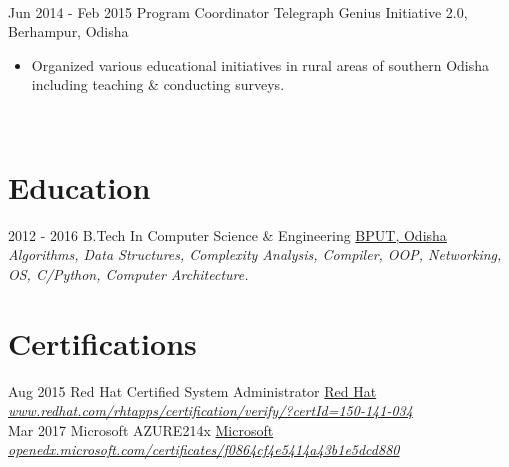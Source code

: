 \documentclass[a4paper]{twentysecondcv} %
\begin{document}
\begin{twenty}
{\begin{itemize}
    \end{itemize}
    	}
        \\
     \twentyitem
   		{Jun 2014 -}
		{Feb 2015}
        {Program Coordinator}
        {Telegraph Genius Initiative 2.0, Berhampur, Odisha}
        {}
        {
        \begin{itemize}
        \item Organized various educational initiatives in rural areas of southern Odisha including teaching \& conducting surveys.
    \end{itemize}
    	}
    	\\
\end{twenty}

\section{Education}
\begin{twenty}
	\twentyitem
    	{2012 - 2016}
		{}
        {B.Tech In Computer Science \& Engineering}
        {\href{http://www.bput.ac.in/}{BPUT, Odisha}}
        {}
        {
        {\emph{Algorithms, Data Structures, Complexity Analysis, Compiler, OOP, Networking, OS, C/Python, Computer Architecture.}\\}
        }
\end{twenty}

\section{Certifications}
\begin{twenty}
	\twentyitem
    	{Aug 2015}
		{}
        {Red Hat Certified System Administrator}
        {\href{https://www.redhat.com/}{Red Hat}}
        {}
        {
        {\emph{\href{https://www.redhat.com/rhtapps/certification/verify/?certId=150-141-034}{www.redhat.com/rhtapps/certification/verify/?certId=150-141-034}}}
        }
        \\
        \twentyitem
    	{Mar 2017}
		{}
        {Microsoft AZURE214x}
        {\href{https://www.microsoft.com/}{Microsoft}}
        {}
        {
        {\emph{\href{https://openedx.microsoft.com/certificates/f0864cf4e5414a4387c0b6b1e5dcd880}{openedx.microsoft.com/certificates/f0864cf4e5414a43b1e5dcd880}}}
        }
\end{twenty}

\vspace{2mm}
\end{document}
